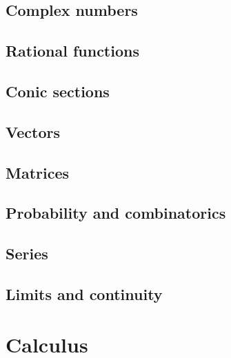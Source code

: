 \documentclass{article}
\begin{document}
\subsection*{Complex numbers}
\subsection*{Rational functions}
\subsection*{Conic sections}
\subsection*{Vectors}
\subsection*{Matrices}
\subsection*{Probability and combinatorics}
\subsection*{Series}
\subsection*{Limits and continuity}

\section*{Calculus}

	
\end{document}
